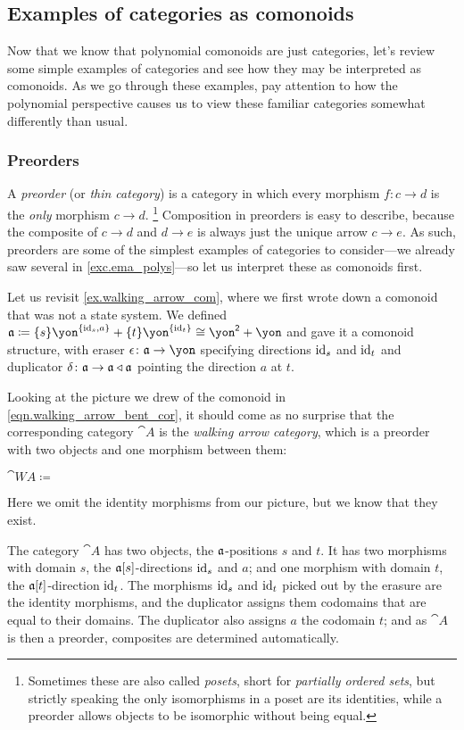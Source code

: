\documentclass[Book-Poly]{subfiles}
\begin{document}
\subsection{Examples of categories as comonoids}
Now that we know that polynomial comonoids are just categories, let's review some simple examples of categories and see how they may be interpreted as comonoids.
As we go through these examples, pay attention to how the polynomial perspective causes us to view these familiar categories somewhat differently than usual. %

\subsubsection{Preorders}

A \emph{preorder} (or \emph{thin category}) is a category in which every morphism $f\colon c\to d$ is the \emph{only} morphism $c\to d$.%
\footnote{Sometimes these are also called \emph{posets}, short for \emph{partially ordered sets}, but strictly speaking the only isomorphisms in a poset are its identities, while a preorder allows objects to be isomorphic without being equal.}
Composition in preorders is easy to describe, because the composite of $c\to d$ and $d\to e$ is always just the unique arrow $c\to e$.
As such, preorders are some of the simplest examples of categories to consider---we already saw several in \cref{exc.ema_polys}---so let us interpret these as comonoids first.

\begin{example}\label{ex.walking_arrow_cat}
Let us revisit \cref{ex.walking_arrow_com}, where we first wrote down a comonoid that was not a state system.
We defined $\ema{a}\coloneqq\{s\}\yon^{\{\id_s,a\}}+\{t\}\yon^{\{\id_t\}}\iso\yon^\2+\yon$ and gave it a comonoid structure, with eraser $\epsilon\colon\ema{a}\to\yon$ specifying directions $\mathrm{id}_s$ and $\mathrm{id}_t$ and duplicator $\delta\colon\mathfrak{a}\to\mathfrak{a}\mathbin{\triangleleft}\mathfrak{a}$ pointing the direction $a$ at $t$.

Looking at the picture we drew of the comonoid in \eqref{eqn.walking_arrow_bent_cor}, it should come as no surprise that the corresponding category $\cat{A}$ is the \emph{walking arrow category}, which is a preorder with two objects and one morphism between them:
\begin{center}
    $\cat{WA}\coloneqq\:$
\end{center}
Here we omit the identity morphisms from our picture, but we know that they exist.

The category $\cat{A}$ has two objects, the $\mathfrak{a}$-positions $s$ and $t$.
It has two morphisms with domain $s$, the $\mathfrak{a}[s]$-directions $\mathrm{id}_s$ and $a$; and one morphism with domain $t$, the $\mathfrak{a}[t]$-direction $\mathrm{id}_t$.
The morphisms $\mathrm{id}_s$ and $\mathrm{id}_t$ picked out by the erasure are the identity morphisms, and the duplicator assigns them codomains that are equal to their domains.
The duplicator also assigns $a$ the codomain $t$; and as $\cat{A}$ is then a preorder, composites are determined automatically.
\end{example}
\end{document}
